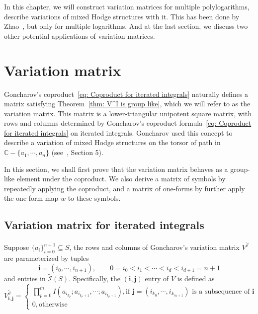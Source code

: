 In this chapter, we will construct variation matrices for multiple polylogarithms, describe variations of mixed Hodge structures with it. This has been done by Zhao~\cite{Zhao_MultipleZetaFunctionsMultiplePolylogarithmsAndTheirSpecialValues}, but only for multiple logarithms. And at the last section, we discuss two other potential applications of variation matrices.

\section{Variation matrix}

Goncharov's coproduct~\eqref{eq: Coproduct for iterated integrals} naturally defines a matrix satisfying Theorem~\ref{thm: V^I is group like}, which we will refer to as the variation matrix. This matrix is a lower-triangular unipotent square matrix, with rows and columns determined by Goncharov's coproduct formula~\eqref{eq: Coproduct for iterated integrals} on iterated integrals. Goncharov used this concept to describe a variation of mixed Hodge structures on the torsor of path in $\mathbb C-\{a_1,\cdots,a_n\}$ (see~\cite{Goncharov_MultiplePolylogarithmsAndMixedTateMotives}, Section 5).

In this section, we shall first prove that the variation matrix behaves as a group-like element under the coproduct. We also derive a matrix of symbols by repeatedly applying the coproduct, and a matrix of one-forms by further apply the one-form map $w$ to these symbols.

\subsection{Variation matrix for iterated integrals}

\begin{definition}\label{def: variation matrix for iterated integrals}
Suppose $\{a_i\}_{i=0}^{n+1}\subseteq S$, the rows and columns of Goncharov's variation matrix $V^{\widetilde{\mathcal  I}}$ are parameterized by tuples
\[\mathbf i=(i_0,\cdots,i_{n+1}),\qquad 0=i_0<i_1<\cdots<i_d<i_{d+1}=n+1
\]
 and entries in $\widetilde{\mathcal I}(S)$. Specifically, the $(\mathbf i,\mathbf j)$ entry of $V$ is defined as
\begin{equation}
V^{\widetilde{\mathcal  I}}_{\mathbf i,\mathbf j}=\begin{cases}
\prod_{p=0}^{m}I(a_{i_{k_p}};a_{i_{k_p+1}},\cdots;a_{i_{k_p+1}}), \text{if $\mathbf j=(i_{k_0},\cdots,i_{k_{m+1}})$ is a subsequence of $\mathbf i$}\\
0,\text{otherwise}
\end{cases}
\end{equation}
\end{definition}

